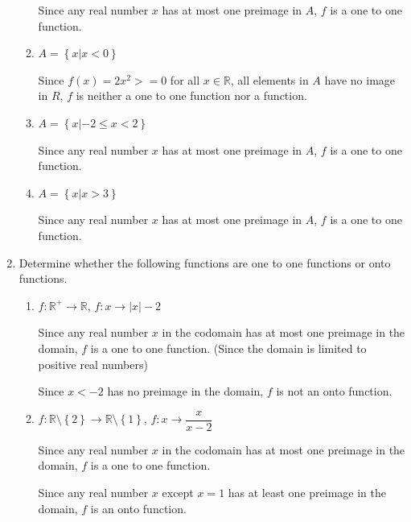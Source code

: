 \documentclass[12pt]{report}
\begin{document}
\begin{enumerate}
\begin{enumerate}
                Since any real number $x$ has at most one preimage in $A$, $f$ is a one to one
                function.

          \item $A = \left\{x | x < 0\right\}$
                \sol{}

                Since $f (x) = 2x^2 >= 0$ for all $x \in \mathbb{R}$, all elements in $A$ have
                no image in $R$, $f$ is neither a one to one function nor a function.

          \item $A = \left\{x | -2 \leq x < 2\right\}$
                \sol{}

                Since any real number $x$ has at most one preimage in $A$, $f$ is a one to one
                function.

          \item $A = \left\{x | x > 3\right\}$
                \sol{}

                Since any real number $x$ has at most one preimage in $A$, $f$ is a one to one
                function.
        \end{enumerate}

        \newpage
  \item Determine whether the following functions are one to one functions or onto
        functions.
        \begin{enumerate}
          \item $f: \mathbb{R}^+ \to \mathbb{R}$, $f:x \to |x|-2$
                \sol{}

                Since any real number $x$ in the codomain has at most one preimage in the
                domain, $f$ is a one to one function. (Since the domain is limited to positive
                real numbers)

                Since $x < -2$ has no preimage in the domain, $f$ is not an onto function.

          \item $f: \mathbb{R}\setminus\left\{2\right\} \to \mathbb{R}\setminus\left\{1\right\}$, $f:x \to \dfrac{x}{x-2}$
                \sol{}

                Since any real number $x$ in the codomain has at most one preimage in the
                domain, $f$ is a one to one function.

                Since any real number $x$ except $x = 1$ has at least one preimage in the
                domain, $f$ is an onto function.


\end{enumerate}
\end{enumerate}
\end{document}
